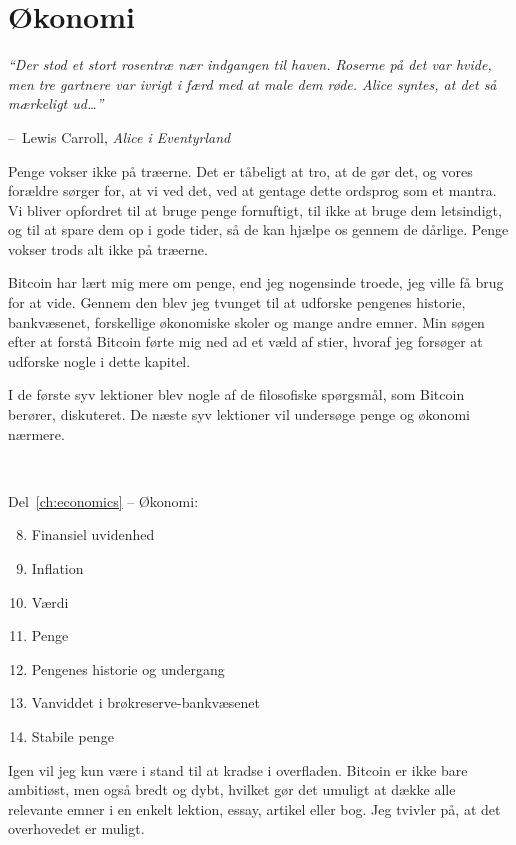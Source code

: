 \documentclass[paper=6in:9in,pagesize=pdftex,
               headinclude=on,footinclude=on,12pt]{scrbook}
\makeatletter
\newenvironment{chapquote}[2][4em]{\setlength{\@tempdima}{#1}%
   \def\chapquote@author{#2}%
   \parshape 1 \@tempdima \dimexpr\textwidth-2\@tempdima\relax%
   \itshape}{\par\normalfont\hfill--\ \chapquote@author\hspace*{\@tempdima}\par\bigskip}
\makeatother
\begin{document}
\chapter*{Økonomi}

\begin{chapquote}{Lewis Carroll, \textit{Alice i Eventyrland}}
\enquote{Der stod et stort rosentræ nær indgangen til haven. Roserne på det var hvide, men tre gartnere var ivrigt i færd med at male dem røde. Alice syntes, at det så mærkeligt ud\ldots}
\end{chapquote}

Penge vokser ikke på træerne. Det er tåbeligt at tro, at de gør det, og vores forældre sørger for, at vi ved det, ved at gentage dette ordsprog som et mantra. Vi bliver opfordret til at bruge penge fornuftigt, til ikke at bruge dem letsindigt, og til at spare dem op i gode tider, så de kan hjælpe os gennem de dårlige. Penge vokser trods alt ikke på træerne.

Bitcoin har lært mig mere om penge, end jeg nogensinde troede, jeg ville få brug for at vide. Gennem den blev jeg tvunget til at udforske pengenes historie, bankvæsenet, forskellige økonomiske skoler og mange andre emner. Min søgen efter at forstå Bitcoin førte mig ned ad et væld af stier, hvoraf jeg forsøger at udforske nogle i dette kapitel.

I de første syv lektioner blev nogle af de filosofiske spørgsmål, som Bitcoin berører, diskuteret. De næste syv lektioner vil undersøge penge og økonomi nærmere.

~\begin{samepage} Del~\ref{ch:economics} -- Økonomi:\begin{enumerate}
  \setcounter{enumi}{7}
  \item Finansiel uvidenhed \item Inflation \item Værdi \item Penge \item Pengenes historie og undergang \item Vanviddet i brøkreserve-bankvæsenet \item Stabile penge \end{enumerate}
\end{samepage}

Igen vil jeg kun være i stand til at kradse i overfladen. Bitcoin er ikke bare ambitiøst, men også bredt og dybt, hvilket gør det umuligt at dække alle relevante emner i en enkelt lektion, essay, artikel eller bog. Jeg tvivler på, at det overhovedet er muligt.
\end{document}
